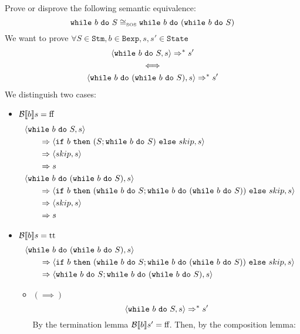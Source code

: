 \begin{exercise}{
    Prove or disprove the following semantic equivalence:
    \[ \texttt{while}\ b\ \texttt{do}\ S \cong_{\text{\tiny SOS}} \texttt{while}\ b\ \texttt{do}\ (\texttt{while}\ b\ \texttt{do}\ S)  \]\vspace*{-0.6cm}
}
    We want to prove $\forall S \in \texttt{Stm}, b \in \texttt{Bexp}, s, s' \in \texttt{State}$
    \begin{gather*}
        \left<\texttt{while}\ b\ \texttt{do}\ S, s\right> \Rightarrow^* s' \\
        \iff \\
        \left<\texttt{while}\ b\ \texttt{do}\ (\texttt{while}\ b\ \texttt{do}\ S), s\right> \Rightarrow^* s'
    \end{gather*}
    We distinguish two cases:
    \begin{itemize}
        \item $\mathcal{B} \llbracket b \rrbracket s = \text{ff}$
            \begin{align*}
                &\left<\texttt{while}\ b\ \texttt{do}\ S, s\right>
                \\&\qquad\Rightarrow \left<\texttt{if}\ b\ \texttt{then}\ (S; \texttt{while}\ b\ \texttt{do}\ S)\ \texttt{else}\ skip, s\right>
                \\&\qquad\Rightarrow \left<skip, s\right>
                \\&\qquad\Rightarrow s
                \\
                &\left<\texttt{while}\ b\ \texttt{do}\ (\texttt{while}\ b\ \texttt{do}\ S), s\right>
                \\&\qquad\Rightarrow \left<\texttt{if}\ b\ \texttt{then}\ (\texttt{while}\ b\ \texttt{do}\ S; \texttt{while}\ b\ \texttt{do}\ (\texttt{while}\ b\ \texttt{do}\ S))\ \texttt{else}\ skip, s\right>
                \\&\qquad\Rightarrow \left<skip, s\right>
                \\&\qquad\Rightarrow s
            \end{align*}
        \item $\mathcal{B} \llbracket b \rrbracket s = \text{tt}$
            \begin{align*}
                &\left<\texttt{while}\ b\ \texttt{do}\ (\texttt{while}\ b\ \texttt{do}\ S), s\right>
                \\&\qquad\Rightarrow \left<\texttt{if}\ b\ \texttt{then}\ (\texttt{while}\ b\ \texttt{do}\ S; \texttt{while}\ b\ \texttt{do}\ (\texttt{while}\ b\ \texttt{do}\ S))\ \texttt{else}\ skip, s\right>
                \\&\qquad\Rightarrow \left<\texttt{while}\ b\ \texttt{do}\ S; \texttt{while}\ b\ \texttt{do}\ (\texttt{while}\ b\ \texttt{do}\ S), s\right>
            \end{align*}
            \begin{itemize}
                \item $(\implies)$
                    \[ \left<\texttt{while}\ b\ \texttt{do}\ S, s\right> \Rightarrow^* s' \]
                    By the termination lemma $\mathcal{B} \llbracket b \rrbracket s' = \text{ff}$. Then, by the composition lemma:

\end{itemize}
\end{itemize}
\end{exercise}
